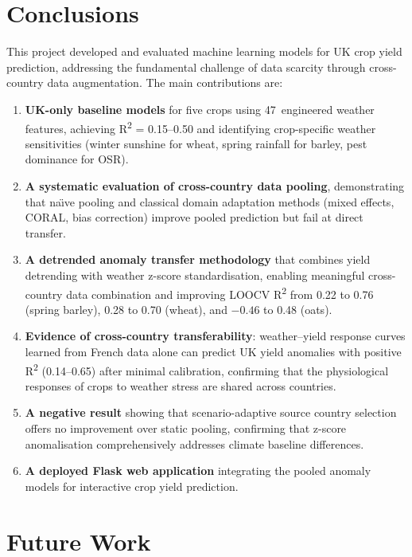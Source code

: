 \documentclass[12pt,a4paper]{report}
\newcommand{\rsq}{R\textsuperscript{2}}
\begin{document}
\section{Conclusions}

This project developed and evaluated machine learning models for UK crop yield prediction, addressing the fundamental challenge of data scarcity through cross-country data augmentation. The main contributions are:

\begin{enumerate}
    \item \textbf{UK-only baseline models} for five crops using 47~engineered weather features, achieving \rsq{} = 0.15--0.50 and identifying crop-specific weather sensitivities (winter sunshine for wheat, spring rainfall for barley, pest dominance for OSR).

    \item \textbf{A systematic evaluation of cross-country data pooling}, demonstrating that na\"{\i}ve pooling and classical domain adaptation methods (mixed effects, CORAL, bias correction) improve pooled prediction but fail at direct transfer.

    \item \textbf{A detrended anomaly transfer methodology} that combines yield detrending with weather z-score standardisation, enabling meaningful cross-country data combination and improving LOOCV \rsq{} from 0.22 to 0.76 (spring barley), 0.28 to 0.70 (wheat), and $-0.46$ to 0.48 (oats).

    \item \textbf{Evidence of cross-country transferability}: weather--yield response curves learned from French data alone can predict UK yield anomalies with positive \rsq{} (0.14--0.65) after minimal calibration, confirming that the physiological responses of crops to weather stress are shared across countries.

    \item \textbf{A negative result} showing that scenario-adaptive source country selection offers no improvement over static pooling, confirming that z-score anomalisation comprehensively addresses climate baseline differences.

    \item \textbf{A deployed Flask web application} integrating the pooled anomaly models for interactive crop yield prediction.
\end{enumerate}

\section{Future Work}
\end{document}
